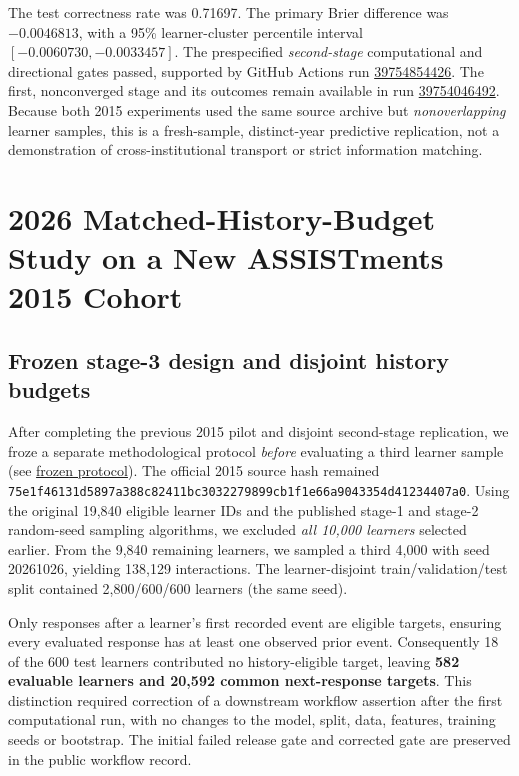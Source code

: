 \documentclass[11pt,a4paper]{article}
\begin{document}
The test correctness rate was 0.71697. The primary Brier difference was $-0.0046813$, with a 95\% learner-cluster percentile interval $[-0.0060730,-0.0033457]$. The prespecified \emph{second-stage} computational and directional gates passed, supported by GitHub Actions run \href{https://github.com/devissaputra/knowledge_tracing_benchmark/actions/runs/39754854426}{39754854426}. The first, nonconverged stage and its outcomes remain available in run \href{https://github.com/devissaputra/knowledge_tracing_benchmark/actions/runs/39754046492}{39754046492}. Because both 2015 experiments used the same source archive but \emph{nonoverlapping} learner samples, this is a fresh-sample, distinct-year predictive replication, not a demonstration of cross-institutional transport or strict information matching.


\section{2026 Matched-History-Budget Study on a New ASSISTments 2015 Cohort}
\subsection{Frozen stage-3 design and disjoint history budgets}
After completing the previous 2015 pilot and disjoint second-stage replication, we froze a separate methodological protocol \emph{before} evaluating a third learner sample (see \href{https://github.com/devissaputra/knowledge_tracing_benchmark/blob/research/kt-methodological-2026-history-budget/METHODOLOGICAL_2026_PROTOCOL.md}{frozen protocol}). The official 2015 source hash remained \texttt{75e1f46131d5897a388c82411bc3032279899cb1f1e66a9043354d41234407a0}. Using the original 19,840 eligible learner IDs and the published stage-1 and stage-2 random-seed sampling algorithms, we excluded \emph{all 10,000 learners} selected earlier. From the 9,840 remaining learners, we sampled a third 4,000 with seed 20261026, yielding 138,129 interactions. The learner-disjoint train/validation/test split contained 2,800/600/600 learners (the same seed).

Only responses after a learner's first recorded event are eligible targets, ensuring every evaluated response has at least one observed prior event. Consequently 18 of the 600 test learners contributed no history-eligible target, leaving \textbf{582 evaluable learners and 20,592 common next-response targets}. This distinction required correction of a downstream workflow assertion after the first computational run, with no changes to the model, split, data, features, training seeds or bootstrap. The initial failed release gate and corrected gate are preserved in the public workflow record.
\end{document}
